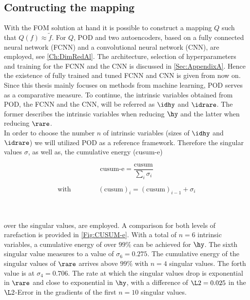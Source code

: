 \subsection{Contructing the mapping}
With the FOM solution at hand it is possible to construct a mapping \(Q\) such that \(Q(f)\approx \tilde{f}\). For \(Q\), POD and two autoencoders, based on a fully connected neural network (FCNN) and a convolutional neural network (CNN), are employed, see \cref{Ch:DimRedAl}. The architecture, selection of hyperparameters and training for the FCNN and the CNN is discussed in \cref{Sec:AppendixA}. Hence the existence of fully trained and tuned FCNN and CNN is given from now on. Since this thesis mainly focuses on methods from machine learning, POD serves as a comparative measure. To continue, the intrinsic variables obtained from POD, the FCNN and the CNN, will be referred as \(\idhy\) and \(\idrare\). The former describes the intrinsic variables when reducing \(\hy\) and the latter when reducing \(\rare\).\\
In order to choose the number \(n\) of intrinsic variables (sizes of \(\idhy\) and \(\idrare\)) we will utilized POD as a reference framework. Therefore the singular values \(\sigma\), as well as, the cumulative energy (cusum-e)\\
\noindent \begin{minipage}{.3\linewidth}
	\begin{equation}
	\textrm{cusum-e} = \frac{\textrm{cusum}}{\sum_i \sigma_i}
	\end{equation}
\end{minipage}%
\begin{minipage}{.7\linewidth}
	\begin{equation}
			\textrm{with} \qquad\qquad(\textrm{cusum})_i =(\text{cusum})_{i-1} + \sigma_{i}
	\end{equation}
\end{minipage}\\\\
over the singular values, are employed. A comparison for both levels of rarefaction is provided in \cref{Fig:CUSUM-e}. With a total of \(n=6\) intrinsic variables, a cumulative energy of over \(99\%\) can be achieved for \(\hy\). The sixth singular value measures to a value of \(\sigma_6 = 0.275\). The cumulative energy of the singular values of \(\rare\) arrives above \(99\%\) with \(n=4\) singular values. The forth value is at \(\sigma_4 = 0.706\). The rate at which the singular values drop is exponential in \(\rare\) and close to exponential  in \(\hy\), with a difference of \(\L2 = 0.025\) in the \(\L2\)-Error in the gradients of the first \(n=10\) singular values.\\
